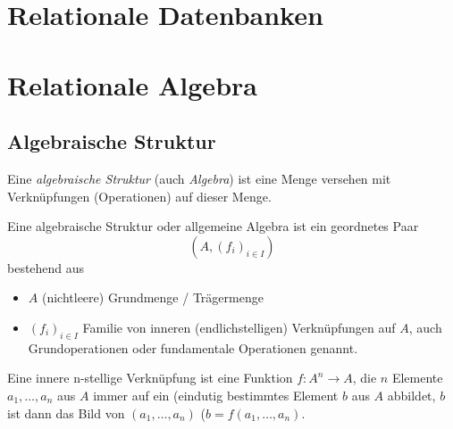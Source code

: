\documentclass{scrbook}
\begin{document}
\tableofcontents

\newpage
\chapter{Relationale Datenbanken}


\chapter{Relationale Algebra}

\section{Algebraische Struktur}
Eine \emph{algebraische Struktur} (auch \emph{Algebra}) ist eine Menge 
versehen mit Verknüpfungen (Operationen) auf dieser Menge.

\begin{definition}
Eine algebraische Struktur oder allgemeine Algebra ist ein geordnetes Paar
\begin{displaymath}
	(A,(f_i)_{i ∈ I})
\end{displaymath}
bestehend aus 
\begin{itemize}
\item $A$ (nichtleere) Grundmenge / Trägermenge
\item $(f_i)_{i ∈ I}$ Familie von inneren (endlichstelligen) Verknüpfungen auf $A$,
	auch Grundoperationen oder fundamentale Operationen genannt.
\end{itemize}
\end{definition}

\begin{definition}
Eine innere n-stellige Verknüpfung ist eine Funktion $f: A^n → A$,
die $n$ Elemente $a_1, \dots, a_n$ aus $A$ immer auf ein (eindutig bestimmtes
Element $b$ aus $A$ abbildet, $b$ ist dann das Bild von $(a_1, \dots, a_n)$ 
($b = f(a_1, \dots, a_n)$.
\end{definition}
\end{document}

